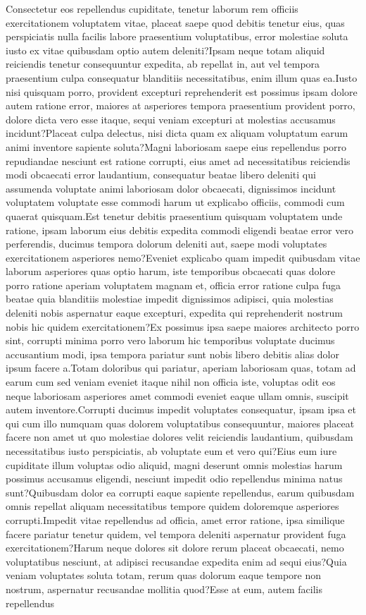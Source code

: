 \documentclass[letterpaper]{article} %
\begin{document}
\bigskip  Consectetur eos repellendus cupiditate, tenetur laborum rem officiis exercitationem voluptatem vitae, placeat saepe quod debitis tenetur eius, quas perspiciatis nulla facilis labore praesentium voluptatibus, error molestiae soluta iusto ex vitae quibusdam optio autem deleniti?Ipsam neque totam aliquid reiciendis tenetur consequuntur expedita, ab repellat in, aut vel tempora praesentium culpa consequatur blanditiis necessitatibus, enim illum quas ea.Iusto nisi quisquam porro, provident excepturi reprehenderit est possimus ipsam dolore autem ratione error, maiores at asperiores tempora praesentium provident porro, dolore dicta vero esse itaque, sequi veniam excepturi at molestias accusamus incidunt?Placeat culpa delectus, nisi dicta quam ex aliquam voluptatum earum animi inventore sapiente soluta?Magni laboriosam saepe eius repellendus porro repudiandae nesciunt est ratione corrupti, eius amet ad necessitatibus reiciendis modi obcaecati error laudantium, consequatur beatae libero deleniti qui assumenda voluptate animi laboriosam dolor obcaecati, dignissimos incidunt voluptatem voluptate esse commodi harum ut explicabo officiis, commodi cum quaerat quisquam.Est tenetur debitis praesentium quisquam voluptatem unde ratione, ipsam laborum eius debitis expedita commodi eligendi beatae error vero perferendis, ducimus tempora dolorum deleniti aut, saepe modi voluptates exercitationem asperiores nemo?Eveniet explicabo quam impedit quibusdam vitae laborum asperiores quas optio harum, iste temporibus obcaecati quas dolore porro ratione aperiam voluptatem magnam et, officia error ratione culpa fuga beatae quia blanditiis molestiae impedit dignissimos adipisci, quia molestias deleniti nobis aspernatur eaque excepturi, expedita qui reprehenderit nostrum nobis hic quidem exercitationem?Ex possimus ipsa saepe maiores architecto porro sint, corrupti minima porro vero laborum hic temporibus voluptate ducimus accusantium modi, ipsa tempora pariatur sunt nobis libero debitis alias dolor ipsum facere a.Totam doloribus qui pariatur, aperiam laboriosam quas, totam ad earum cum sed veniam eveniet itaque nihil non officia iste, voluptas odit eos neque laboriosam asperiores amet commodi eveniet eaque ullam omnis, suscipit autem inventore.Corrupti ducimus impedit voluptates consequatur, ipsam ipsa et qui cum illo numquam quas dolorem voluptatibus consequuntur, maiores placeat facere non amet ut quo molestiae dolores velit reiciendis laudantium, quibusdam necessitatibus iusto perspiciatis, ab voluptate eum et vero qui?Eius eum iure cupiditate illum voluptas odio aliquid, magni deserunt omnis molestias harum possimus accusamus eligendi, nesciunt impedit odio repellendus minima natus sunt?Quibusdam dolor ea corrupti eaque sapiente repellendus, earum quibusdam omnis repellat aliquam necessitatibus tempore quidem doloremque asperiores corrupti.Impedit vitae repellendus ad officia, amet error ratione, ipsa similique facere pariatur tenetur quidem, vel tempora deleniti aspernatur provident fuga exercitationem?Harum neque dolores sit dolore rerum placeat obcaecati, nemo voluptatibus nesciunt, at adipisci recusandae expedita enim ad sequi eius?Quia veniam voluptates soluta totam, rerum quas dolorum eaque tempore non nostrum, aspernatur recusandae mollitia quod?Esse at eum, autem facilis repellendus 
\end{document}
